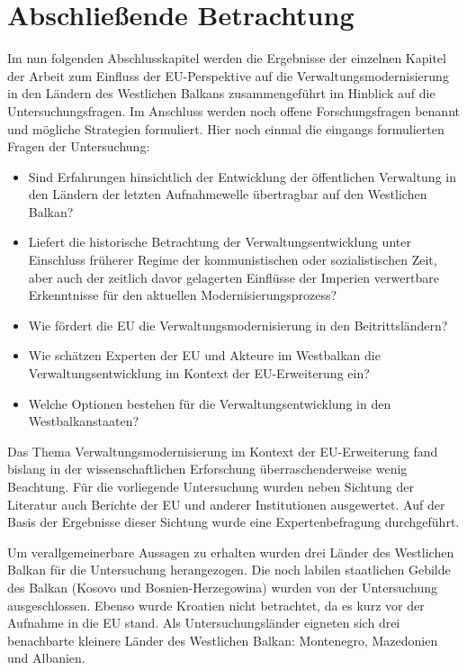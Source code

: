 \chapter{Abschließende Betrachtung}\label{chap:abschlBetrachtung}
Im nun folgenden Abschlusskapitel werden die Ergebnisse der einzelnen Kapitel der Arbeit zum Einfluss der EU-Perspektive auf die Verwaltungsmodernisierung in den Ländern des Westlichen Balkans zusammengeführt im Hinblick auf die Untersuchungsfragen. Im Anschluss werden noch offene Forschungsfragen benannt und mögliche Strategien formuliert. Hier noch einmal die eingangs formulierten Fragen der Untersuchung:
\begin{itemize} \itemsep1pt \parskip0pt 
\item Sind Erfahrungen hinsichtlich der Entwicklung der öffentlichen Verwaltung in den Ländern der letzten Aufnahmewelle übertragbar auf den Westlichen Balkan?
\item Liefert die historische Betrachtung der Verwaltungsentwicklung unter Einschluss früherer Regime der kommunistischen oder sozialistischen Zeit, aber auch der zeitlich davor gelagerten Einflüsse der Imperien verwertbare Erkenntnisse für den aktuellen Modernisierungsprozess?
\item Wie fördert die EU die Verwaltungsmodernisierung in den Beitrittsländern?
\item Wie schätzen Experten der EU und Akteure im Westbalkan die Verwaltungsentwicklung im Kontext der EU-Erweiterung ein?
\item Welche Optionen bestehen für die Verwaltungsentwicklung in den Westbalkanstaaten?
\end{itemize}
Das Thema Verwaltungsmodernisierung im Kontext der EU-Erweiterung fand bislang in der wissenschaftlichen Erforschung überraschenderweise wenig Beachtung. Für die vorliegende Untersuchung wurden neben Sichtung der Literatur auch Berichte der EU und anderer Institutionen ausgewertet. Auf der Basis der Ergebnisse dieser Sichtung wurde eine Expertenbefragung durchgeführt.\par
Um verallgemeinerbare Aussagen zu erhalten wurden drei Länder des Westlichen Balkan für die Untersuchung herangezogen. Die noch labilen staatlichen Gebilde des Balkan (Kosovo und Bosnien-Herzegowina) wurden von der Untersuchung ausgeschlossen. Ebenso wurde Kroatien nicht betrachtet, da es kurz vor der Aufnahme in die EU stand. Als Untersuchungsländer eigneten sich drei benachbarte kleinere Länder des Westlichen Balkan: Montenegro, Mazedonien und Albanien.\par
